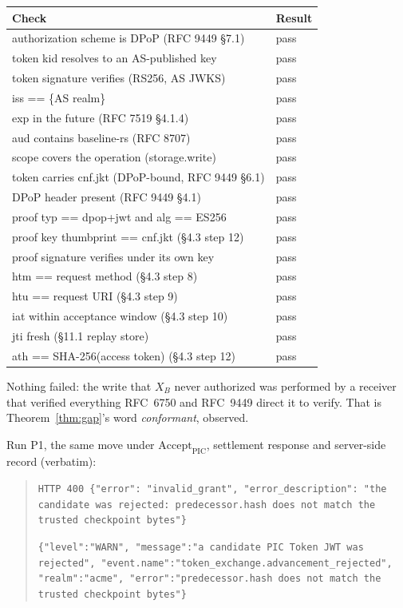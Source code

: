 \documentclass[conference]{IEEEtran}
\newcommand{\Accept}{\mathrm{Accept}}
\begin{document}
\begin{center}
\scriptsize
\begin{tabular}{@{}ll@{}}
\toprule
\textbf{Check} & \textbf{Result} \\
\midrule
authorization scheme is DPoP (RFC 9449 \S7.1) & pass \\
token kid resolves to an AS-published key & pass \\
token signature verifies (RS256, AS JWKS) & pass \\
iss == \{AS realm\} & pass \\
exp in the future (RFC 7519 \S4.1.4) & pass \\
aud contains baseline-rs (RFC 8707) & pass \\
scope covers the operation (storage.write) & pass \\
token carries cnf.jkt (DPoP-bound, RFC 9449 \S6.1) & pass \\
DPoP header present (RFC 9449 \S4.1) & pass \\
proof typ == dpop+jwt and alg == ES256 & pass \\
proof key thumbprint == cnf.jkt (\S4.3 step 12) & pass \\
proof signature verifies under its own key & pass \\
htm == request method (\S4.3 step 8) & pass \\
htu == request URI (\S4.3 step 9) & pass \\
iat within acceptance window (\S4.3 step 10) & pass \\
jti fresh (\S11.1 replay store) & pass \\
ath == SHA-256(access token) (\S4.3 step 12) & pass \\
\bottomrule
\end{tabular}
\end{center}

Nothing failed: the write that $X_B$ never authorized was performed by a receiver that verified everything RFC~6750 and RFC~9449 direct it to verify. That is Theorem~\ref{thm:gap}'s word \emph{conformant}, observed.

Run P1, the same move under $\Accept_{\mathrm{PIC}}$, settlement response and server-side record (verbatim):

\begin{quote}
\scriptsize
\texttt{HTTP 400 \{"error": "invalid\_grant", "error\_description": "the candidate was rejected: predecessor.hash does not match the trusted checkpoint bytes"\}}

\texttt{\{"level":"WARN", "message":"a candidate PIC Token JWT was rejected", "event.name":"token\_exchange.advancement\_rejected", "realm":"acme", "error":"predecessor.hash does not match the trusted checkpoint bytes"\}}
\end{quote}
\end{document}

